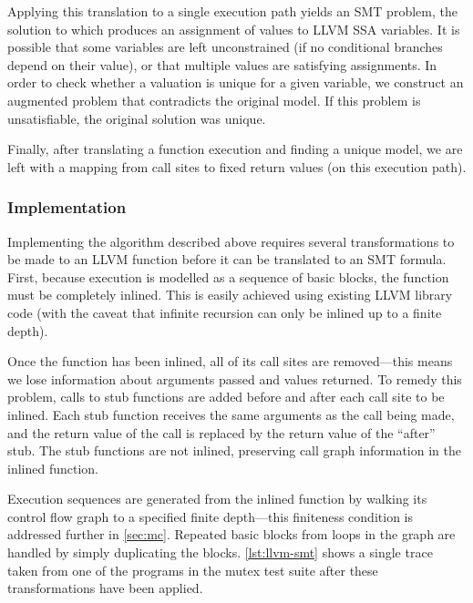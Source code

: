 Applying this translation to a single execution path yields an SMT problem, the
solution to which produces an assignment of values to LLVM SSA variables. It is
possible that some variables are left unconstrained (if no conditional branches
depend on their value), or that multiple values are satisfying assignments. In
order to check whether a valuation is unique for a given variable, we construct
an augmented problem that contradicts the original model. If this problem is
unsatisfiable, the original solution was unique.

Finally, after translating a function execution and finding a unique model, we
are left with a mapping from call sites to fixed return values (on this
execution path).

\subsubsection{Implementation}

Implementing the algorithm described above requires several transformations to
be made to an LLVM function before it can be translated to an SMT
formula. First, because execution is modelled as a sequence of basic
blocks, the function must be completely inlined. This is easily achieved using
existing LLVM library code (with the caveat that infinite recursion can only be
inlined up to a finite depth).

Once the function has been inlined, all of its call sites are removed---this
means we lose information about arguments passed and values returned. To remedy
this problem, calls to stub functions are added before and after each call site
to be inlined. Each stub function receives the same arguments as the call being
made, and the return value of the call is replaced by the return value of the
``after'' stub. The stub functions are not inlined, preserving call graph
information in the inlined function.

Execution sequences are generated from the inlined function by walking its
control flow graph to a specified finite depth---this finiteness condition is
addressed further in \autoref{sec:mc}. Repeated basic blocks from loops in the
graph are handled by simply duplicating the blocks. \autoref{lst:llvm-smt} shows
a single trace taken from one of the programs in the mutex test suite after
these transformations have been applied.

